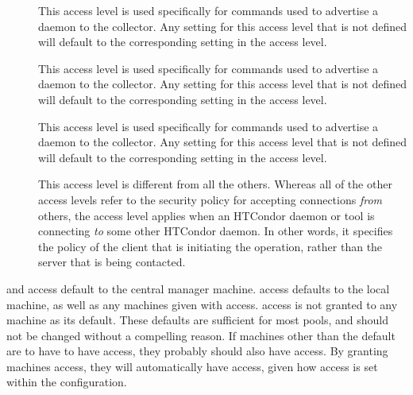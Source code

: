 \begin{description}
\item[] \label{dcperm:advertise-master} This
   access level is used specifically for commands used to advertise a
    daemon to the collector.  Any setting for this access
   level that is not defined will default to the corresponding setting
   in the  access level.

\item[] \label{dcperm:advertise-startd} This
   access level is used specifically for commands used to advertise a
    daemon to the collector.  Any setting for this access
   level that is not defined will default to the corresponding setting
   in the  access level.

\item[] \label{dcperm:advertise-schedd} This
   access level is used specifically for commands used to advertise a
    daemon to the collector.  Any setting for this access
   level that is not defined will default to the corresponding setting
   in the  access level.

\item[] \label{dcperm:client} This access level is
   different from all the others.  Whereas all of the other access levels
   refer to the security policy for accepting connections \emph{from} others,
   the  access level applies when an HTCondor daemon or tool is
   connecting \emph{to} some other HTCondor daemon.  In other words, it specifies
   the policy of the client that is initiating the operation, rather than
   the server that is being contacted.

\end{description}

 and  access default to 
the central manager machine.
 access defaults to the local machine, as well as
any machines
given with  access.
 access is not granted to any machine
as its default.
These defaults are sufficient for most pools, and should not be changed without
a compelling reason.
If machines other than the default are to have to have 
access, they probably should also have  access.
By granting machines  access, they
will automatically have  access, given how
 access is set within the configuration.

